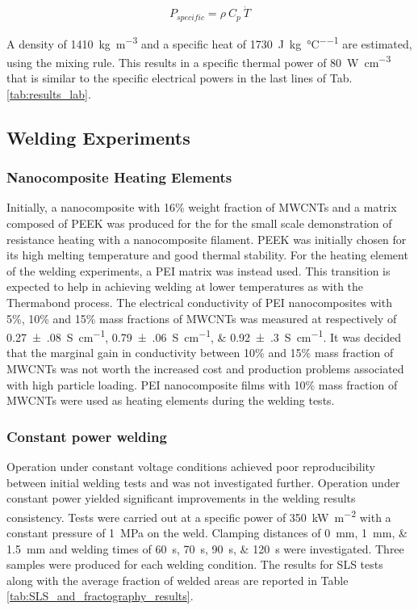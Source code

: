 \documentclass[11pt,review,times]{elsarticle}
\begin{document}
\begin{equation}
P_{specific} = \rho \ C_p \ \dot{T}
\label{eq:specific_power}
\end{equation}

A density of \SI{1410}{\kg\per\cubic\m} and a specific heat of \SI{1730}{\joule\per\kg\per\celsius} are estimated, using the mixing rule. 
This results in a specific thermal power of \SI{80}{\W\per\cubic\cm} that is similar to the specific electrical powers in the last lines of Tab. \ref{tab:results_lab}.  

\FloatBarrier

\subsection{Welding Experiments}

\subsubsection{Nanocomposite Heating Elements}

Initially, a nanocomposite with 16\% weight fraction of MWCNTs and a matrix composed of PEEK was produced for the for the small scale demonstration of resistance heating with a nanocomposite filament. 
PEEK was initially chosen for its high melting temperature and good thermal stability. 
For the heating element of the welding experiments, a PEI matrix was instead used.  
This transition is expected to help in achieving welding at lower temperatures as with the Thermabond process. 
The electrical conductivity of PEI nanocomposites with 5\%, 10\% and 15\% mass fractions of MWCNTs was measured at respectively of \SIlist[multi-part-units = single]{0.27(08);0.79(06);0.92(30)}{\siemens\per\cm}. 
It was decided that the marginal gain in conductivity between 10\% and 15\% mass fraction of MWCNTs was not worth the increased cost and production problems associated with high particle loading. 
PEI nanocomposite films with 10\% mass fraction of MWCNTs were used as heating elements during the welding tests. 

\subsubsection{Constant power welding}
\FloatBarrier

Operation under constant voltage conditions achieved poor reproducibility between initial welding tests and was not investigated further. 
Operation under constant power yielded significant improvements in the welding results consistency. 
Tests were carried out at a specific power of \SI{350}{\kW\per\square\metre} with a constant pressure of \SI{1}{\MPa} on the weld. 
Clamping distances of \SIlist{0;1;1.5}{\mm} and welding times of \SIlist{60;70;90;120}{\s} were investigated. 
Three samples were produced for each welding condition. 
The results for SLS tests along with the average fraction of welded areas are reported in Table \ref{tab:SLS_and_fractography_results}. 
\end{document}

